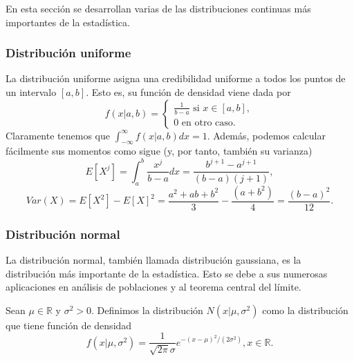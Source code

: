 \documentclass{article}
\begin{document}
En esta sección se desarrollan varias de las distribuciones continuas más importantes de la estadística.

\subsubsection{Distribución uniforme}

La distribución uniforme asigna una credibilidad uniforme a todos los puntos de un intervalo $[a,b]$. Esto es, su función de densidad viene dada por
\[f(x|a,b) = \begin{cases}\frac{1}{b-a} \text{ si } x \in [a,b], \\ 0 \text{ en otro caso.}\end{cases}\]
Claramente tenemos que $\int_{-\infty}^{\infty} f(x |a,b) dx = 1$. Además, podemos calcular fácilmente sus momentos como sigue (y, por tanto, también su varianza)
\[E[X^j] = \int_a^b \frac{x^j}{b-a} dx = \frac{b^{j+1} - a^{j+1}}{(b-a) (j+1)},\]
\[Var(X) = E[X^2] - E[X]^2 = \frac{a^2 + ab + b^2}{3} - \frac{(a+b^2)}{4} = \frac{(b-a)^2}{12}.\]

\subsubsection{Distribución normal}

La distribución normal, también llamada distribución gaussiana, es la distribución más importante de la estadística. Esto se debe a sus numerosas aplicaciones en análisis de poblaciones y al teorema central del límite.

\begin{definition}
    Sean $\mu \in \mathbb{R}$ y $\sigma^2 > 0$. Definimos la distribución $N(x | \mu, \sigma^2)$ como la distribución que tiene función de densidad
    \[f(x | \mu, \sigma^2) = \frac{1}{\sqrt{2\pi}\sigma}e^{-(x-\mu)^2 / (2\sigma^2)}, x \in \mathbb{R}.\]
\end{definition}
\end{document}
